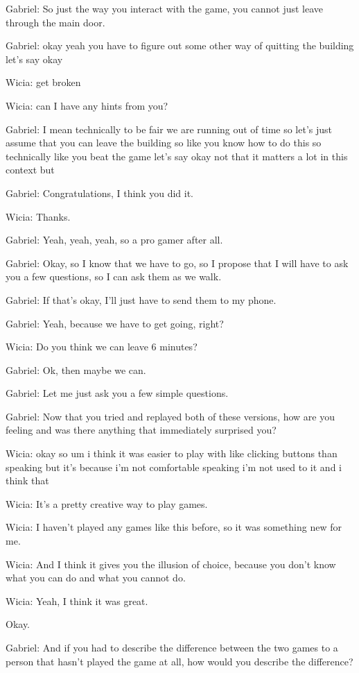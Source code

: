 Gabriel: So just the way you interact with the game, you cannot just leave through the main door.

Gabriel: okay yeah you have to figure out some other way of quitting the building let's say okay

Wicia: get broken

Wicia: can I have any hints from you?

Gabriel: I mean technically to be fair we are running out of time so let's just assume that you can leave the building so like you know how to do this so technically like you beat the game let's say okay not that it matters a lot in this context but

Gabriel: Congratulations, I think you did it.

Wicia: Thanks.

Gabriel: Yeah, yeah, yeah, so a pro gamer after all.

Gabriel: Okay, so I know that we have to go, so I propose that I will have to ask you a few questions, so I can ask them as we walk.

Gabriel: If that's okay, I'll just have to send them to my phone.

Gabriel: Yeah, because we have to get going, right?

Wicia: Do you think we can leave 6 minutes?

Gabriel: Ok, then maybe we can.

Gabriel: Let me just ask you a few simple questions.

Gabriel: Now that you tried and replayed both of these versions, how are you feeling and was there anything that immediately surprised you?

Wicia: okay so um i think it was easier to play with like clicking buttons than speaking but it's because i'm not comfortable speaking i'm not used to it and i think that

Wicia: It's a pretty creative way to play games.

Wicia: I haven't played any games like this before, so it was something new for me.

Wicia: And I think it gives you the illusion of choice, because you don't know what you can do and what you cannot do.

Wicia: Yeah, I think it was great.

Okay.

Gabriel: And if you had to describe the difference between the two games to a person that hasn't played the game at all, how would you describe the difference?

